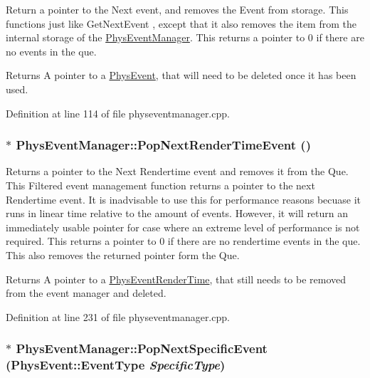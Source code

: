 Return a pointer to the Next event, and removes the Event from storage. This functions just like GetNextEvent , except that it also removes the item from the internal storage of the \hyperlink{classPhysEventManager}{PhysEventManager}. This returns a pointer to 0 if there are no events in the que. \begin{DoxyReturn}{Returns}
A pointer to a \hyperlink{classPhysEvent}{PhysEvent}, that will need to be deleted once it has been used. 
\end{DoxyReturn}


Definition at line 114 of file physeventmanager.cpp.\hypertarget{classPhysEventManager_ad627925363fdbcff98e0faef204e81e2}{
\subsubsection[{PopNextRenderTimeEvent}]{ $\ast$ PhysEventManager::PopNextRenderTimeEvent ()}}
\label{d5/dd7/classPhysEventManager_ad627925363fdbcff98e0faef204e81e2}


Returns a pointer to the Next Rendertime event and removes it from the Que. This Filtered event management function returns a pointer to the next Rendertime event. It is inadvisable to use this for performance reasons becuase it runs in linear time relative to the amount of events. However, it will return an immediately usable pointer for case where an extreme level of performance is not required. This returns a pointer to 0 if there are no rendertime events in the que. This also removes the returned pointer form the Que. \begin{DoxyReturn}{Returns}
A pointer to a \hyperlink{classPhysEventRenderTime}{PhysEventRenderTime}, that still needs to be removed from the event manager and deleted. 
\end{DoxyReturn}


Definition at line 231 of file physeventmanager.cpp.\hypertarget{classPhysEventManager_abce156f7ad7ab145b8b05740b48e6073}{
\subsubsection[{PopNextSpecificEvent}]{ $\ast$ PhysEventManager::PopNextSpecificEvent (PhysEvent::EventType {\em SpecificType})}}
\label{d5/dd7/classPhysEventManager_abce156f7ad7ab145b8b05740b48e6073}


